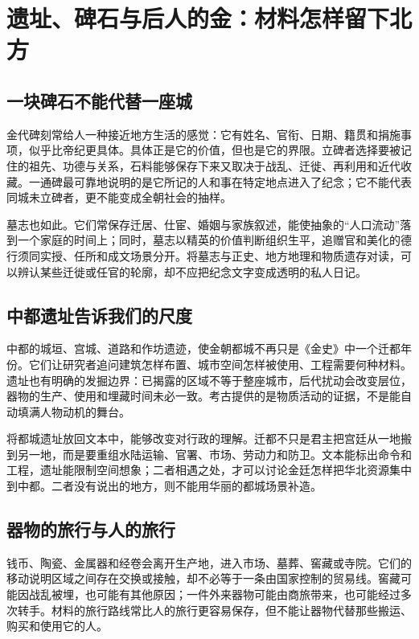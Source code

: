 \section{遗址、碑石与后人的金：材料怎样留下北方}

\subsection{一块碑石不能代替一座城}

金代碑刻常给人一种接近地方生活的感觉：它有姓名、官衔、日期、籍贯和捐施事项，似乎比帝纪更具体。具体正是它的价值，但也是它的界限。立碑者选择要被记住的祖先、功德与关系，石料能够保存下来又取决于战乱、迁徙、再利用和近代收藏。一通碑最可靠地说明的是它所记的人和事在特定地点进入了纪念；它不能代表同城未立碑者，更不能变成全朝社会的抽样。

墓志也如此。它们常保存迁居、仕宦、婚姻与家族叙述，能使抽象的“人口流动”落到一个家庭的时间上；同时，墓志以精英的价值判断组织生平，追赠官和美化的德行须同实授、任所和成文场景分开。将墓志与正史、地方地理和物质遗存对读，可以辨认某些迁徙或任官的轮廓，却不应把纪念文字变成透明的私人日记。

\subsection{中都遗址告诉我们的尺度}

中都的城垣、宫城、道路和作坊遗迹，使金朝都城不再只是《金史》中一个迁都年份。它们让研究者追问建筑怎样布置、城市空间怎样被使用、工程需要何种材料。遗址也有明确的发掘边界：已揭露的区域不等于整座城市，后代扰动会改变层位，器物的生产、使用和埋藏时间未必一致。考古提供的是物质活动的证据，不是能自动填满人物动机的舞台。

将都城遗址放回文本中，能够改变对行政的理解。迁都不只是君主把宫廷从一地搬到另一地，而是要重组水陆运输、官署、市场、劳动力和防卫。文本能标出命令和工程，遗址能限制空间想象；二者相遇之处，才可以讨论金廷怎样把华北资源集中到中都。二者没有说出的地方，则不能用华丽的都城场景补造。

\subsection{器物的旅行与人的旅行}

钱币、陶瓷、金属器和经卷会离开生产地，进入市场、墓葬、窖藏或寺院。它们的移动说明区域之间存在交换或接触，却不必等于一条由国家控制的贸易线。窖藏可能因战乱被埋，也可能有其他原因；一件外来器物可能由商旅带来，也可能经过多次转手。材料的旅行路线常比人的旅行更容易保存，但不能让器物代替那些搬运、购买和使用它的人。

